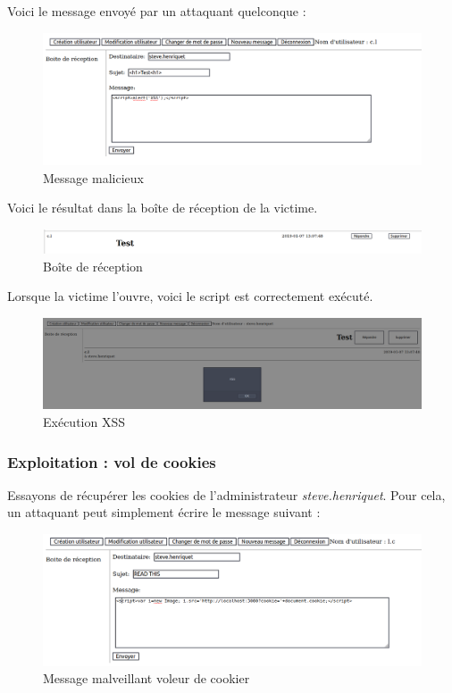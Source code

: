 \documentclass[12pt]{article}
\begin{document}
Voici le message envoyé par un attaquant quelconque : 
\begin{figure}[H]
\centering
\includegraphics[width=\linewidth]{images/xssAttack.png}
\caption{Message malicieux}
\end{figure}

Voici le résultat dans la boîte de réception de la victime.
\begin{figure}[H]
\centering
\includegraphics[width=\linewidth]{images/xssRecep.png}
\caption{Boîte de réception}
\end{figure}

Lorsque la victime l'ouvre, voici le script est correctement exécuté.
\begin{figure}[H]
\centering
\includegraphics[width=\linewidth]{images/xssOpen.png}
\caption{Exécution XSS}
\end{figure}

\subsubsection{Exploitation : vol de cookies}
Essayons de récupérer les cookies de l'administrateur \textit{steve.henriquet}. Pour cela, un attaquant peut simplement écrire le message suivant : 

\begin{figure}[H]
\centering
\includegraphics[width=\linewidth]{images/cookieStealer.png}
\caption{Message malveillant voleur de cookier}
\end{figure}
\end{document}

